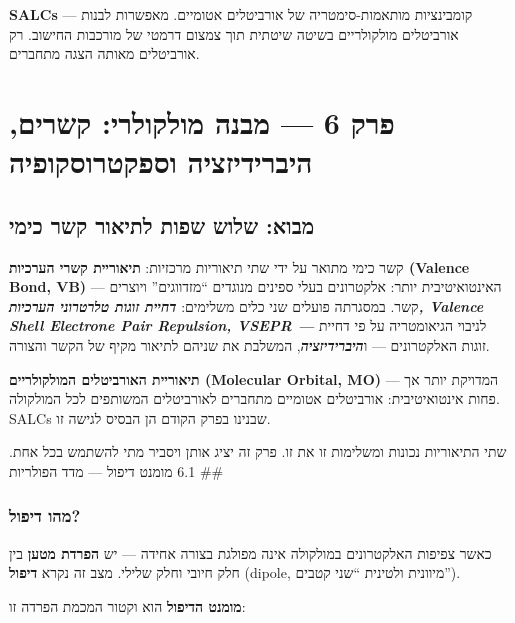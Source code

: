 \documentclass[
  hebrew,
  letterpaper,
  DIV=11,
  numbers=noendperiod]{scrreprt}
\begin{document}
\textbf{SALCs} --- קומבינציות מותאמות-סימטריה של אורביטלים אטומיים.
מאפשרות לבנות אורביטלים מולקולריים בשיטה שיטתית תוך צמצום דרמטי של
מורכבות החישוב. רק אורביטלים מאותה הצגה מתחברים.


\chapter{פרק 6 --- מבנה מולקולרי: קשרים, היברידיזציה
וספקטרוסקופיה}\label{ux5e4ux5e8ux5e7-6-ux5deux5d1ux5e0ux5d4-ux5deux5d5ux5dcux5e7ux5d5ux5dcux5e8ux5d9-ux5e7ux5e9ux5e8ux5d9ux5dd-ux5d4ux5d9ux5d1ux5e8ux5d9ux5d3ux5d9ux5d6ux5e6ux5d9ux5d4-ux5d5ux5e1ux5e4ux5e7ux5d8ux5e8ux5d5ux5e1ux5e7ux5d5ux5e4ux5d9ux5d4}

\section{מבוא: שלוש שפות לתיאור קשר
כימי}\label{ux5deux5d1ux5d5ux5d0-ux5e9ux5dcux5d5ux5e9-ux5e9ux5e4ux5d5ux5ea-ux5dcux5eaux5d9ux5d0ux5d5ux5e8-ux5e7ux5e9ux5e8-ux5dbux5d9ux5deux5d9}

קשר כימי מתואר על ידי שתי תיאוריות מרכזיות: \textbf{תיאוריית קשרי
הערכיות (Valence Bond, VB)} --- האינטואיטיבית יותר: אלקטרונים בעלי
ספינים מנוגדים ``מזדווגים'' ויוצרים קשר. במסגרתה פועלים שני כלים
משלימים: \textbf{\emph{דחיית זוגות טלרטרוני הערכיות, Valence Shell
Electrone Pair Repulsion, VSEPR ---}} לניבוי הגיאומטריה על פי דחיית
זוגות האלקטרונים --- ו\textbf{\emph{היברידיזציה}}, המשלבת את שניהם
לתיאור מקיף של הקשר והצורה.

\textbf{תיאוריית האורביטלים המולקולריים (Molecular Orbital, MO)} ---
המדויקת יותר אך פחות אינטואיטיבית: אורביטלים אטומיים מתחברים לאורביטלים
המשותפים לכל המולקולה. SALCs שבנינו בפרק הקודם הן הבסיס לגישה זו.

שתי התיאוריות נכונות ומשלימות זו את זו. פרק זה יציג אותן ויסביר מתי
להשתמש בכל אחת. \#\# 6.1 מומנט דיפול --- מדד הפולריות

\subsection{מהו דיפול?}\label{ux5deux5d4ux5d5-ux5d3ux5d9ux5e4ux5d5ux5dc}

כאשר צפיפות האלקטרונים במולקולה אינה מפולגת בצורה אחידה --- יש
\textbf{הפרדת מטען} בין חלק חיובי וחלק שלילי. מצב זה נקרא \textbf{דיפול}
(dipole, מיוונית ולטינית ``שני קטבים'').

\textbf{מומנט הדיפול} הוא וקטור המכמת הפרדה זו:
\end{document}
